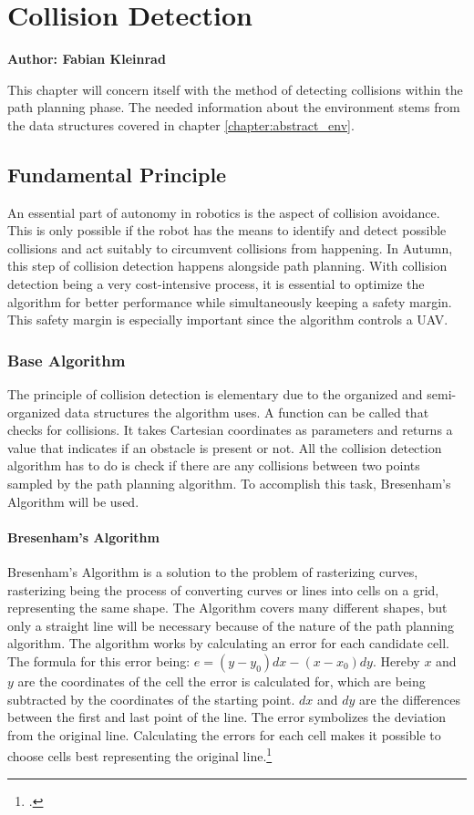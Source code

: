 \chapter{Collision Detection}
\label{chapter:collision_detection}

\textbf{Author: Fabian Kleinrad} 

This chapter will concern itself with the method of detecting collisions within the path planning phase. The needed information about the environment stems from the data structures covered in chapter \ref{chapter:abstract_env}. 

\section{Fundamental Principle}
An essential part of autonomy in robotics is the aspect of collision avoidance. This is only possible if the robot has the means to identify and detect possible collisions and act suitably to circumvent collisions from happening.\newline
In Autumn, this step of collision detection happens alongside path planning. With collision detection being a very cost-intensive process, it is essential to optimize the algorithm for better performance while simultaneously keeping a safety margin. This safety margin is especially important since the algorithm controls a UAV. 

\subsection{Base Algorithm}
The principle of collision detection is elementary due to the organized and semi-organized data structures the algorithm uses. A function can be called that checks for collisions. It takes Cartesian coordinates as parameters and returns a value that indicates if an obstacle is present or not. All the collision detection algorithm has to do is check if there are any collisions between two points sampled by the path planning algorithm. To accomplish this task, Bresenham's Algorithm will be used.\newline

\subsubsection{Bresenham's Algorithm} 
Bresenham's Algorithm is a solution to the problem of rasterizing curves, rasterizing being the process of converting curves or lines into cells on a grid, representing the same shape. The Algorithm covers many different shapes, but only a straight line will be necessary because of the nature of the path planning algorithm.
The algorithm works by calculating an error for each candidate cell. The formula for this error being: $e=(y-y_0)dx-(x-x_0)dy$. Hereby $x$ and $y$ are the coordinates of the cell the error is calculated for, which are being subtracted by the coordinates of the starting point. $dx$ and $dy$ are the differences between the first and last point of the line.
The error symbolizes the deviation from the original line. Calculating the errors for each cell makes it possible to choose cells best representing the original line.\footcite{Zingl2012}

